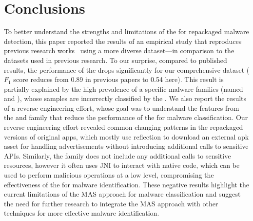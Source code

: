 \section{Conclusions}\label{sec:conclusions}


To better understand the strengths and limitations of the \mas for repackaged malware detection, this paper reported the results of an empirical study that reproduces previous research works~\cite{DBLP:conf/wcre/BaoLL18,DBLP:journals/jss/CostaMMSSBNR22} using a more diverse dataset---in comparison to the datasets used in previous research. To our surprise, compared to published results, the performance of the \mas drops significantly for our comprehensive dataset ($F_1$ score reduces from 0.89 in previous papers to 0.54 here). This result is partially explained by the high prevalence of a specific malware families (named \gps and \rmb), whose samples are incorrectly classified by the \mas. We also report the results of a reverse engineering effort, whose goal was to understand the features from the \gps and \rmb family that reduce the performance of the \mas for malware classification. Our reverse engineering effort revealed common changing patterns in the \gps repackaged versions of original apps, which mostly use reflection to download an external apk asset for handling advertisements without introducing additional calls to sensitive APIs. Similarly, the \rmb family does not include any additional calls to sensitive resources, however it often uses JNI to interact with native code, which can be used to perform malicious operations at a low level, compromising the effectiveness of the \mas for malware identification. These negative results highlight the current limitations of the MAS approach for malware classification and suggest the need for further research to integrate the MAS approach with other techniques for more effective malware identification.







